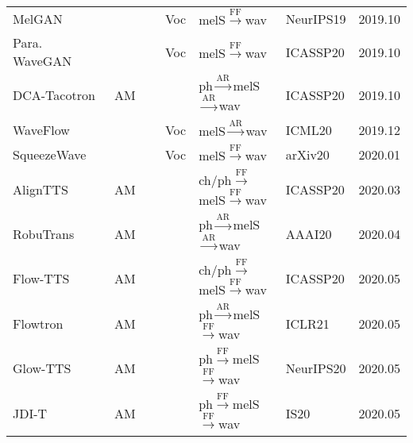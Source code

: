 \documentclass{article}
\begin{document}
\begin{center}
\begin{longtable}{l | l | l | l | l }
		MelGAN~\cite{kumar2019melgan}                 & ~~~~~~~~Voc      & {\color{red}melS}$\stackrel{\text{FF}}{\longrightarrow}$wav   & NeurIPS19 & 2019.10         \\
		Para. WaveGAN~\cite{yamamoto2020parallel}       & ~~~~~~~~Voc      & {\color{red}melS}$\stackrel{\text{FF}}{\longrightarrow}$wav   & ICASSP20 & 2019.10        \\
		DCA-Tacotron~\cite{battenberg2020location}               & AM     &  {\color{blue}ph}$\stackrel{\text{AR}}{\longrightarrow}${\color{red}melS}$\stackrel{\text{AR}}{\longrightarrow}$wav               & ICASSP20 & 2019.10  \\
		WaveFlow~\cite{ping2020waveflow}               & ~~~~~~~~Voc      & {\color{red}melS}$\stackrel{\text{AR}}{\longrightarrow}$wav   & ICML20 &2019.12        \\
		SqueezeWave~\cite{zhai2020squeezewave}            & ~~~~~~~~Voc      & {\color{red}melS}$\stackrel{\text{FF}}{\longrightarrow}$wav          &arXiv20& 2020.01          \\
		AlignTTS~\cite{zeng2020aligntts}               & AM     &  {\color{blue}ch/ph}$\stackrel{\text{FF}}{\longrightarrow}${\color{red}melS}$\stackrel{\text{FF}}{\longrightarrow}$wav               & ICASSP20 & 2020.03         \\
		RobuTrans~\cite{li2020robutrans}              & AM     &  {\color{blue}ph}$\stackrel{\text{AR}}{\longrightarrow}${\color{red}melS}$\stackrel{\text{AR}}{\longrightarrow}$wav               & AAAI20 & 2020.04         \\
		Flow-TTS~\cite{miao2020flow}               & AM   &    {\color{blue}ch/ph}$\stackrel{\text{FF}}{\longrightarrow}${\color{red}melS}$\stackrel{\text{FF}}{\longrightarrow}$wav               & ICASSP20 & 2020.05        \\
		Flowtron~\cite{valle2020flowtron}               & AM       &   {\color{blue}ph}$\stackrel{\text{AR}}{\longrightarrow}${\color{red}melS}$\stackrel{\text{FF}}{\longrightarrow}$wav     &ICLR21 & 2020.05         \\
		Glow-TTS~\cite{kim2020glow}               & AM       & {\color{blue}ph}$\stackrel{\text{FF}}{\longrightarrow}${\color{red}melS}$\stackrel{\text{FF}}{\longrightarrow}$wav               & NeurIPS20& 2020.05        \\
		JDI-T~\cite{lim2020jdi}                  & AM       &  {\color{blue}ph}$\stackrel{\text{FF}}{\longrightarrow}${\color{red}melS}$\stackrel{\text{FF}}{\longrightarrow}$wav             &IS20& 2020.05     \\

\end{longtable}
\end{center}
\end{document}
